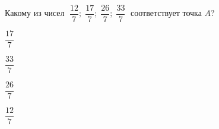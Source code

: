 \begin{ex}
	\begin{condition}
		Какому из чисел \( \;\dfrac{12}{7};\;\dfrac{17}{7};\;\dfrac{26}{7};\;\dfrac{33}{7}\; \) соответствует точка $A$?
		
		\selectanswer
		\begin{enumcols}[columns=4]
			\item $\dfrac{17}{7}$
			\item $\dfrac{33}{7}$
			\item $\dfrac{26}{7}$
			\item $\dfrac{12}{7}$
		\end{enumcols}
	\end{condition}
\end{ex}